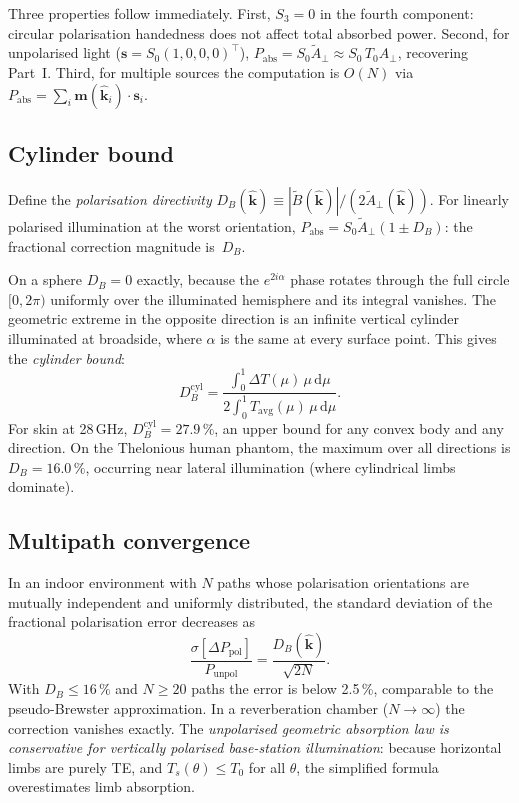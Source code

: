 \documentclass[11pt,a4paper]{article}
\theoremstyle{definition}
\newcommand{\khat}{\hat{\bm{k}}}
\newcommand{\Tavg}{T_{\mathrm{avg}}}
\newcommand{\Aperp}{A_{\perp}}
\newcommand{\diff}{\mathrm{d}}
\begin{document}
Three properties follow immediately.  First, $S_3=0$ in the fourth
component: circular polarisation handedness does not affect total
absorbed power.  Second, for unpolarised light ($\mathbf{s}=S_0(1,0,0,0)^\top$),
$P_{\mathrm{abs}}=S_0\tilde{A}_\perp\approx S_0\,T_0\Aperp$,
recovering Part~I.  Third, for multiple sources the computation is
$O(N)$ via $P_{\mathrm{abs}}=\sum_i\mathbf{m}(\khat_i)\cdot\mathbf{s}_i$.

\subsection{Cylinder bound}

Define the \emph{polarisation directivity}
$D_B(\khat)\equiv|\tilde{B}(\khat)|/(2\tilde{A}_\perp(\khat))$.  For
linearly polarised illumination at the worst orientation,
$P_{\mathrm{abs}}=S_0\tilde{A}_\perp(1\pm D_B)$: the fractional
correction magnitude is~$D_B$.

On a sphere $D_B=0$ exactly, because the $e^{2i\alpha}$ phase rotates
through the full circle$[0,2\pi)$ uniformly over the illuminated
hemisphere and its integral vanishes.  The geometric extreme in the
opposite direction is an infinite vertical cylinder illuminated at
broadside, where $\alpha$ is the same at every surface point.  This
gives the \emph{cylinder bound}:
\begin{equation}
  D_B^{\mathrm{cyl}}
  = \frac{\int_0^1\Delta T(\mu)\,\mu\,\diff\mu}%
         {2\int_0^1\Tavg(\mu)\,\mu\,\diff\mu}.
\end{equation}
For skin at 28\,GHz, $D_B^{\mathrm{cyl}}=27.9\,\%$, an upper bound for
any convex body and any direction.  On the Thelonious human phantom,
the maximum over all directions is $D_B=16.0\,\%$, occurring near
lateral illumination (where cylindrical limbs dominate).

\subsection{Multipath convergence}

In an indoor environment with $N$ paths whose polarisation orientations
are mutually independent and uniformly distributed, the standard deviation
of the fractional polarisation error decreases as
\begin{equation}
  \frac{\sigma[\Delta P_{\mathrm{pol}}]}{P_{\mathrm{unpol}}}
  = \frac{D_B(\khat)}{\sqrt{2N}}.
\end{equation}
With $D_B\le 16\,\%$ and $N\ge 20$ paths the error is below 2.5\,\%,
comparable to the pseudo-Brewster approximation.  In a reverberation
chamber ($N\to\infty$) the correction vanishes exactly.  The
\emph{unpolarised geometric absorption law is conservative for
vertically polarised base-station illumination}: because horizontal
limbs are purely TE, and $T_s(\theta)\le T_0$ for all $\theta$, the
simplified formula overestimates limb absorption.
\end{document}

